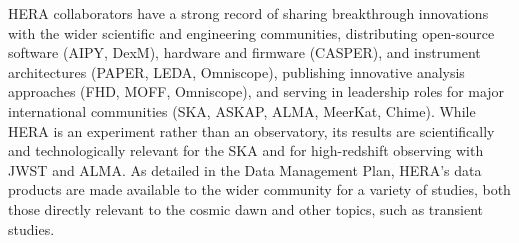 \documentclass[preprint]{aastex}
\newcommand{\compress}{\vspace{-0.25in}}
\begin{document}
HERA collaborators have a strong record of sharing breakthrough
innovations with the wider scientific and engineering communities, distributing 
open-source software (AIPY, DexM), hardware and firmware (CASPER), 
and instrument architectures (PAPER, LEDA, Omniscope),
publishing innovative analysis approaches (FHD, MOFF,
Omniscope), and serving in leadership roles for major international communities (SKA, ASKAP, ALMA, MeerKat, Chime).  
While HERA is an experiment rather than an observatory, its
results are scientifically and technologically relevant for the
SKA and for high-redshift observing with JWST and ALMA.
As detailed in the Data Management Plan, HERA's data products are made available to the wider
community for a variety of studies, both those directly
relevant to the cosmic dawn and other topics, such as transient studies. 



\end{document}
